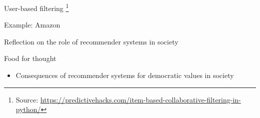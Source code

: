 \begin{frame}{User-based filtering}
	\footnote{Source: \url{https://predictivehacks.com/item-based-collaborative-filtering-in-python/}}
\end{frame}

\begin{frame}{Example: Amazon}
\end{frame}


\begin{frame}{Reflection on the role of recommender systems in society}
	\begin{alertblock}{Food for thought}
		\begin{itemize}
			\item <1->Consequences of recommender systems for democratic values in society
		\end{itemize}
	\end{alertblock}
\end{frame}


